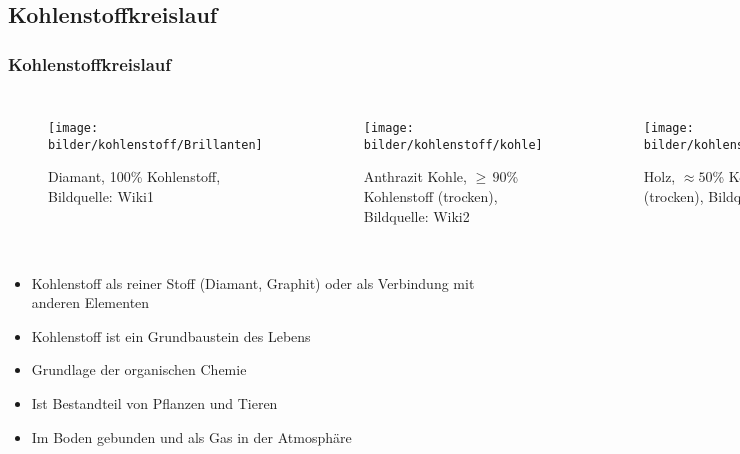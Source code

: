 \subsection{Kohlenstoffkreislauf}

\begin{frame}
	\frametitle{Kohlenstoffkreislauf}
	\begin{columns}
		\begin{figure}
			\centering
			\texttt{[image: bilder/kohlenstoff/Brillanten]}
			\caption{Diamant, 100\% Kohlenstoff, Bildquelle: Wiki1}
		\end{figure}
		\begin{figure}
			\centering
			\texttt{[image: bilder/kohlenstoff/kohle]}
			\caption{Anthrazit Kohle, $\geq\,90$\% Kohlenstoff (trocken), Bildquelle: Wiki2}
		\end{figure}
		\begin{figure}
			\centering
			\texttt{[image: bilder/kohlenstoff/holz]}
			\caption{Holz, $\approx 50$\% Kohlenstoff (trocken), Bildquelle: Wiki3}
		\end{figure}
		\begin{figure}
			\centering
			\texttt{[image: bilder/kohlenstoff/co2]}
			\caption{Kohlenstoffdioxid $\text{CO}_2$, Ein Kohlenstoff und zwei Sauerstoff Atome, Bildquelle: Wiki4}
		\end{figure}
	\end{columns}
		\begin{itemize}
			\item Kohlenstoff als reiner Stoff (Diamant, Graphit) oder als Verbindung mit anderen Elementen
			\item Kohlenstoff ist ein Grundbaustein des Lebens
			\item Grundlage der organischen Chemie
			\item Ist Bestandteil von Pflanzen und Tieren
			\item Im Boden gebunden und als Gas in der Atmosphäre
		\end{itemize}

\end{frame}

